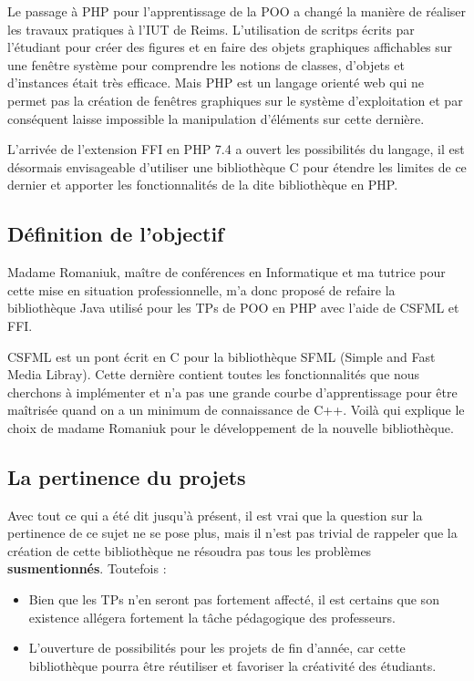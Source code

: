 \documentclass[11pt,a4paper,krantz2,11pt,oneside]{krantz}
\begin{document}
Le passage à PHP pour l'apprentissage de la POO a changé la manière de réaliser les travaux pratiques à l'IUT de Reims. L'utilisation de scritps écrits par l'étudiant pour créer des figures et en faire des objets graphiques affichables sur une fenêtre système pour comprendre les notions de classes, d'objets et d'instances était très efficace. Mais PHP est un langage orienté web qui ne permet pas la création de fenêtres graphiques sur le système d'exploitation et par conséquent laisse impossible la manipulation d'éléments sur cette dernière.

L'arrivée de l'extension FFI en PHP 7.4 a ouvert les possibilités du langage, il est désormais envisageable d'utiliser une bibliothèque C pour étendre les limites de ce dernier et apporter les fonctionnalités de la dite bibliothèque en PHP.

\hypertarget{duxe9finition-de-lobjectif}{%
\subsection{Définition de l'objectif}\label{duxe9finition-de-lobjectif}}

Madame Romaniuk, maître de conférences en Informatique et ma tutrice pour cette mise en situation professionnelle, m'a donc proposé de refaire la bibliothèque Java utilisé pour les TPs de POO en PHP avec l'aide de CSFML et FFI.

CSFML est un pont écrit en C pour la bibliothèque SFML (Simple and Fast Media Libray). Cette dernière contient toutes les fonctionnalités que nous cherchons à implémenter et n'a pas une grande courbe d'apprentissage pour être maîtrisée quand on a un minimum de connaissance de C++. Voilà qui explique le choix de madame Romaniuk pour le développement de la nouvelle bibliothèque.

\hypertarget{la-pertinence-du-projets}{%
\subsection{La pertinence du projets}\label{la-pertinence-du-projets}}

Avec tout ce qui a été dit jusqu'à présent, il est vrai que la question sur la pertinence de ce sujet ne se pose plus, mais il n'est pas trivial de rappeler que la création de cette bibliothèque ne résoudra pas tous les problèmes \textbf{susmentionnés}. Toutefois :

\begin{itemize}
\item
  Bien que les TPs n'en seront pas fortement affecté, il est certains que son existence allégera fortement la tâche pédagogique des professeurs.
\item
  L'ouverture de possibilités pour les projets de fin d'année, car cette bibliothèque pourra être réutiliser et favoriser la créativité des étudiants.
\end{itemize}
\end{document}
